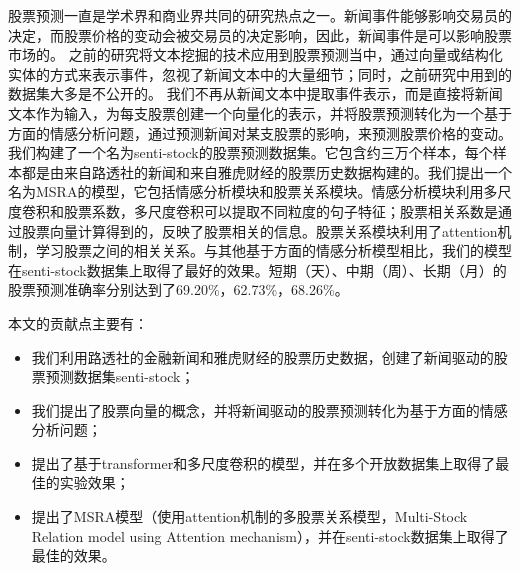 \begin{cabstract}
  股票预测一直是学术界和商业界共同的研究热点之一。新闻事件能够影响交易员的决定，而股票价格的变动会被交易员的决定影响，因此，新闻事件是可以影响股票市场的。
  之前的研究将文本挖掘的技术应用到股票预测当中，通过向量或结构化实体的方式来表示事件，忽视了新闻文本中的大量细节；同时，之前研究中用到的数据集大多是不公开的。
  我们不再从新闻文本中提取事件表示，而是直接将新闻文本作为输入，为每支股票创建一个向量化的表示，并将股票预测转化为一个基于方面的情感分析问题，通过预测新闻对某支股票的影响，来预测股票价格的变动。我们构建了一个名为senti-stock的股票预测数据集。它包含约三万个样本，每个样本都是由来自路透社的新闻和来自雅虎财经的股票历史数据构建的。我们提出一个名为MSRA的模型，它包括情感分析模块和股票关系模块。情感分析模块利用多尺度卷积和股票系数，多尺度卷积可以提取不同粒度的句子特征；股票相关系数是通过股票向量计算得到的，反映了股票相关的信息。股票关系模块利用了attention机制，学习股票之间的相关关系。与其他基于方面的情感分析模型相比，我们的模型在senti-stock数据集上取得了最好的效果。短期（天）、中期（周）、长期（月）的股票预测准确率分别达到了69.20\%，62.73\%，68.26\%。
  
本文的贡献点主要有：
  \begin{itemize}
  	\item 我们利用路透社的金融新闻和雅虎财经的股票历史数据，创建了新闻驱动的股票预测数据集senti-stock；
  	\item 我们提出了股票向量的概念，并将新闻驱动的股票预测转化为基于方面的情感分析问题；
  	\item 提出了基于transformer和多尺度卷积的模型，并在多个开放数据集上取得了最佳的实验效果；
  	\item 提出了MSRA模型（使用attention机制的多股票关系模型，Multi-Stock Relation model using Attention mechanism），并在senti-stock数据集上取得了最佳的效果。
  \end{itemize}

\end{cabstract}

